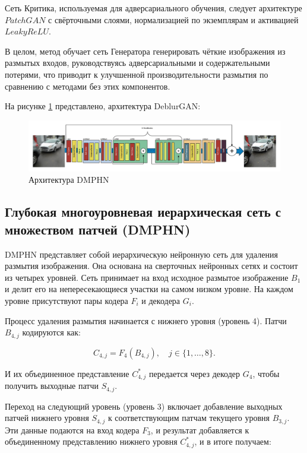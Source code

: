 Сеть Критика, используемая для адверсариального обучения, следует архитектуре \(PatchGAN\) с свёрточными слоями, нормализацией по экземплярам и активацией \(LeakyReLU\).

В целом, метод обучает сеть Генератора генерировать чёткие изображения из размытых входов, руководствуясь адверсариальными и содержательными потерями, что приводит к улучшенной производительности размытия по сравнению с методами без этих компонентов.

На рисунке \ref{fig:deblur-gan} представлено, архитектура DeblurGAN:
\begin{figure}[H]
	\centering
	\includegraphics[width=1\linewidth]{assets/deblur-gan.png}
	\caption{Архитектура DMPHN}
	\label{fig:deblur-gan}
\end{figure}


\subsection{Глубокая многоуровневая иерархическая сеть с множеством патчей (DMPHN)}

DMPHN представляет собой иерархическую нейронную сеть для удаления размытия изображения. Она основана на сверточных нейронных сетях и состоит из четырех уровней. Сеть принимает на вход исходное размытое изображение \(B_1\) и делит его на непересекающиеся участки на самом низком уровне. На каждом уровне присутствуют пары кодера \(F_i\) и декодера \(G_i\).

Процесс удаления размытия начинается с нижнего уровня (уровень 4). Патчи \(B_{4,j}\) кодируются как:

\begin{equation}
	C_{4,j} = F_{4}(B_{4,j}), \quad j \in \{1, \dots, 8\}.
\end{equation}

И их объединенное представление \(C_{4,j}^{\ast}\) передается через декодер \(G_{4}\), чтобы получить выходные патчи \(S_{4,j}\).

Переход на следующий уровень (уровень 3) включает добавление выходных патчей нижнего уровня \(S_{4,j}\) к соответствующим патчам текущего уровня \(B_{3,j}\). Эти данные подаются на вход кодера \(F_{3}\), и результат добавляется к объединенному представлению нижнего уровня \(C_{4,j}^{\ast}\), и в итоге получаем:

